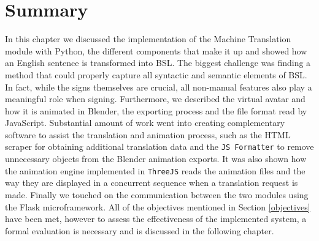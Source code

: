 \documentclass[12pt]{ociamthesis}  %
\newcommand{\tech}{\texttt}
\begin{document}
\section{Summary}
In this chapter we discussed the implementation of the Machine Translation module with Python, the different components that make it up and showed how an English sentence is transformed into BSL. The biggest challenge was finding a method that could properly capture all syntactic and semantic elements of BSL. In fact, while the signs themselves are crucial, all non-manual features also play a meaningful role when signing. Furthermore, we described the virtual avatar and how it is animated in Blender, the exporting process and the file format read by JavaScript. Substantial amount of work went into creating complementary software to assist the translation and animation process, such as the HTML scraper for obtaining additional translation data and the \texttt{JS Formatter} to remove unnecessary objects from the Blender animation exports. It was also shown how the animation engine implemented in \tech{ThreeJS} reads the animation files and the way they are displayed in a concurrent sequence when a translation request is made. Finally we touched on the communication between the two modules using the Flask microframework. All of the objectives mentioned in Section \ref{objectives} have been met, however to assess the effectiveness of the implemented system, a formal evaluation is necessary and is discussed in the following chapter. 

\end{document}
